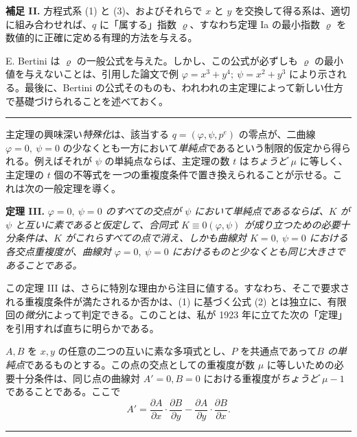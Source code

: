 \textbf{補足 II.} 方程式系 (1) と (3)、およびそれらで \(x\) と \(y\) を交換して得る系は、適切に組み合わせれば、\(q\) に「属する」指数 \(\varrho\)、すなわち定理 Ia の最小指数 \(\varrho\) を数値的に正確に定める有理的方法を与える。

E. Bertini は \(\varrho\) の一般公式を与えた。しかし、この公式が必ずしも \(\varrho\) の最小値を与えないことは、引用した論文で例 \(\varphi=x^3+y^4;\ \psi=x^2+y^3\) により示される。最後に、Bertini の公式そのものも、われわれの主定理によって新しい仕方で基礎づけられることを述べておく。

\begin{center}
\rule{4cm}{0.4pt}
\end{center}

主定理の興味深い\emph{特殊化}は、該当する \(q=(\varphi,\psi,p^e)\) の零点が、二曲線 \(\varphi=0,\ \psi=0\) の少なくとも一方において\emph{単純点}であるという制限的仮定から得られる。例えばそれが \(\psi\) の単純点ならば、主定理の数 \(t\) は\emph{ちょうど} \(\mu\) に等しく、主定理の \(t\) 個の不等式を\emph{一つ}の重複度条件で置き換えられることが示せる。これは次の一般定理を導く。

\textbf{定理 III.} \emph{\(\varphi=0,\ \psi=0\) の\emph{すべての}交点が \(\psi\) において\emph{単純点}であるならば、\(K\) が \(\psi\) と互いに素であると仮定して、合同式 \(K\equiv0(\varphi,\psi)\) が成り立つための\emph{必要十分条件}は、\(K\) がこれらすべての点で消え、しかも曲線対 \(K=0,\ \psi=0\) における各交点重複度が、曲線対 \(\varphi=0,\ \psi=0\) におけるものと少なくとも同じ大きさであることである。}

この定理 III は、さらに特別な理由から注目に値する。すなわち、そこで要求される重複度条件が満たされるか否かは、(1) に基づく公式 (2) とは独立に、有限回の\emph{微分}によって判定できる。このことは、私が 1923 年に立てた次の「定理」を引用すれば直ちに明らかである。

\(A,B\) を \(x,y\) の任意の二つの互いに素な多項式とし、\(P\) を共通点であって\emph{\(B\) の単純点}であるものとする。この点の交点としての重複度が数 \(\mu\) に等しいための必要十分条件は、同じ点の曲線対 \(A'=0, B=0\) における重複度が\emph{ちょうど} \(\mu-1\) であることである。ここで
\[
A'=\frac{\partial A}{\partial x}\cdot\frac{\partial B}{\partial y}
-\frac{\partial A}{\partial y}\cdot\frac{\partial B}{\partial x}.
\]

\begin{center}
\rule{4cm}{0.4pt}
\end{center}

